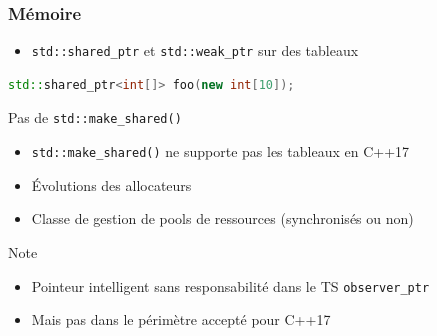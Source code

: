 \documentclass[C++.tex]{subfiles}
\begin{document}
\begin{frame}[fragile]
	\frametitle{Mémoire}
	\begin{itemize}
		\item \lstinline|std::shared_ptr| et \lstinline|std::weak_ptr| sur des tableaux
	\end{itemize}

	\begin{lstlisting}[language=C++]
std::shared_ptr<int[]> foo(new int[10]);\end{lstlisting}

	\begin{alertblock}{Pas de \lstinline|std::make_shared()|}
		\begin{itemize}
			\item \lstinline|std::make_shared()| ne supporte pas les tableaux en C++17
		\end{itemize}
	\end{alertblock}

	\begin{itemize}
		\item Évolutions des allocateurs


		\item Classe de gestion de pools de ressources (synchronisés ou non)
	\end{itemize}

	\begin{block}{Note}
		\begin{itemize}
			\item Pointeur intelligent sans responsabilité dans le TS \lstinline|observer_ptr|
			\item Mais pas dans le périmètre accepté pour C++17
		\end{itemize}
	\end{block}
\end{frame}
\end{document}
